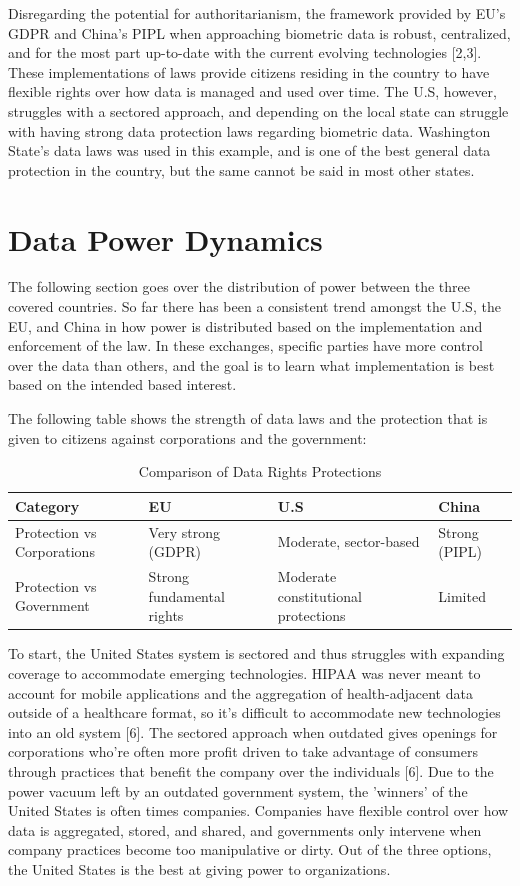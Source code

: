 \documentclass[conference]{IEEEtran}
\begin{document}
Disregarding the potential for authoritarianism, the framework provided by EU's GDPR and China's PIPL when approaching biometric data is robust, centralized, and for the most part up-to-date with the current evolving technologies [2,3]. These implementations of laws provide citizens residing in the country to have flexible rights over how data is managed and used over time. The U.S, however, struggles with a sectored approach, and depending on the local state can struggle with having strong data protection laws regarding biometric data. Washington State's data laws was used in this example, and is one of the best general data protection in the country, but the same cannot be said in most other states. 


\section{Data Power Dynamics}

The following section goes over the distribution of power between the three covered countries. So far there has been a consistent trend amongst the U.S, the EU, and China in how power is distributed based on the implementation and enforcement of the law. In these exchanges, specific parties have more control over the data than others, and the goal is to learn what implementation is best based on the intended based interest. 

The following table shows the strength of data laws and the protection that is given to citizens against corporations and the government:

\begin{table}[h]
\centering
\caption{Comparison of Data Rights Protections}
\begin{tabularx}{\columnwidth}{lXXX}
\hline
\textbf{Category} & \textbf{EU} & \textbf{U.S} & \textbf{China} \\
\hline
Protection vs Corporations & Very strong (GDPR) & Moderate, sector-based & Strong (PIPL) \\
Protection vs Government & Strong fundamental rights & Moderate constitutional protections & Limited \\
\hline
\end{tabularx}
\label{tab:data_rights_comparison}
\end{table}

To start, the United States system is sectored and thus struggles with expanding coverage to accommodate emerging technologies. HIPAA was never meant to account for mobile applications and the aggregation of health-adjacent data outside of a healthcare format, so it's difficult to accommodate new technologies into an old system [6]. The sectored approach when outdated gives openings for corporations who're often more profit driven to take advantage of consumers through practices that benefit the company over the individuals [6]. Due to the power vacuum left by an outdated government system, the 'winners' of the United States is often times companies. Companies have flexible control over how data is aggregated, stored, and shared, and governments only intervene when company practices become too manipulative or dirty. Out of the three options, the United States is the best at giving power to organizations.
\end{document}
